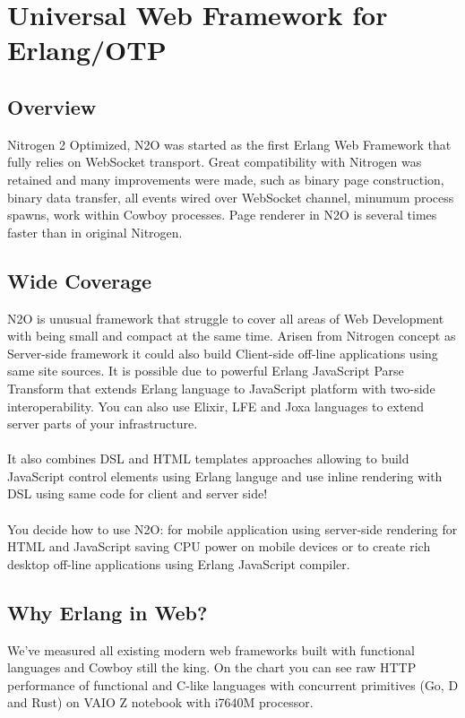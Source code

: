 \section{Universal Web Framework for Erlang/OTP}

\subsection*{Overview}
Nitrogen 2 Optimized, N2O was started as the first Erlang Web Framework
that fully relies on WebSocket transport. Great compatibility with Nitrogen
was retained and many improvements were made, such as binary page construction,
binary data transfer, all events wired over WebSocket channel, minumum process spawns,
work within Cowboy processes. Page renderer in N2O is several times faster
than in original Nitrogen.

\subsection*{Wide Coverage}
N2O is unusual framework that struggle to cover all areas of Web Development
with being small and compact at the same time. Arisen from Nitrogen concept
as Server-side framework it could also build Client-side off-line applications
using same site sources. It is possible due to powerful Erlang JavaScript Parse
Transform that extends Erlang language to JavaScript platform with two-side
interoperability. You can also use Elixir, LFE and Joxa languages to extend
server parts of your infrastructure.

\paragraph{}
It also combines DSL and HTML templates approaches allowing to build JavaScript
control elements using Erlang languge and use inline rendering with DSL using
same code for client and server side!

\paragraph{}
You decide how to use N2O: for mobile application using server-side rendering
for HTML and JavaScript saving CPU power on mobile devices or to create rich desktop
off-line applications using Erlang JavaScript compiler.

\subsection*{Why Erlang in Web?}
We've measured all existing modern web frameworks built with functional
languages and Cowboy still the king. On the chart you can see raw HTTP
performance of functional and C-like languages with concurrent
primitives (Go, D and Rust) on VAIO Z notebook with i7640M processor.

